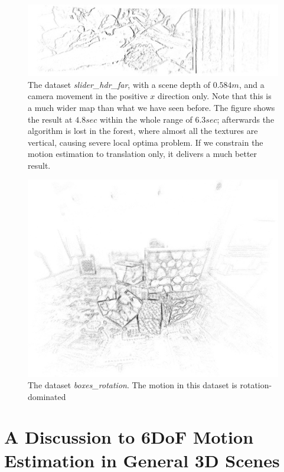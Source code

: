 \begin{figure}
  \centering
  \includegraphics[width=\textwidth]{images/slider_hdr_far_map_36.jpg}
  \caption{The dataset \textit{slider\_hdr\_far}, with a scene depth
    of $0.584 m$, and a camera movement in the positive $x$ direction
    only. Note that this is a much wider map than what we have seen
    before. The figure shows the result at $4.8 sec$ within the whole
    range of $6.3 sec$; afterwards the algorithm is lost in the
    forest, where almost all the textures are vertical, causing severe
    local optima problem. If we constrain the motion estimation to
    translation only, it delivers a much better result.}

  \label{fig:slider_hdr_far_map}
\end{figure}
\begin{figure}
  \centering
  \includegraphics[width=\textwidth]{images/boxes_rotation_map.jpg}
  \caption{The dataset \textit{boxes\_rotation}. The motion in this
    dataset is rotation-dominated}
  \label{fig:boxes_rotation_map}
\end{figure}




\chapter{A Discussion to 6DoF Motion Estimation in General 3D Scenes}
\label{chap:general_scene}



